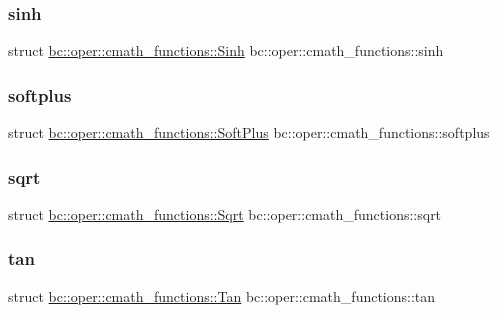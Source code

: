 \subsubsection{\texorpdfstring{sinh}{sinh}}
{\footnotesize\ttfamily struct \hyperlink{structbc_1_1oper_1_1cmath__functions_1_1Sinh}{bc\+::oper\+::cmath\+\_\+functions\+::\+Sinh}   bc\+::oper\+::cmath\+\_\+functions\+::sinh}

\mbox{\label{namespacebc_1_1oper_1_1cmath__functions_a47ed73f57df7e47d19f5ea67a5f6cd37}} 
\subsubsection{\texorpdfstring{softplus}{softplus}}
{\footnotesize\ttfamily struct \hyperlink{structbc_1_1oper_1_1cmath__functions_1_1SoftPlus}{bc\+::oper\+::cmath\+\_\+functions\+::\+Soft\+Plus}   bc\+::oper\+::cmath\+\_\+functions\+::softplus}

\mbox{\label{namespacebc_1_1oper_1_1cmath__functions_ac4449711290e599a4227690d5fe4babe}} 
\subsubsection{\texorpdfstring{sqrt}{sqrt}}
{\footnotesize\ttfamily struct \hyperlink{structbc_1_1oper_1_1cmath__functions_1_1Sqrt}{bc\+::oper\+::cmath\+\_\+functions\+::\+Sqrt}   bc\+::oper\+::cmath\+\_\+functions\+::sqrt}

\mbox{\label{namespacebc_1_1oper_1_1cmath__functions_a90b54d1a21cfe0a38460d448a09f746a}} 
\subsubsection{\texorpdfstring{tan}{tan}}
{\footnotesize\ttfamily struct \hyperlink{structbc_1_1oper_1_1cmath__functions_1_1Tan}{bc\+::oper\+::cmath\+\_\+functions\+::\+Tan}   bc\+::oper\+::cmath\+\_\+functions\+::tan}

